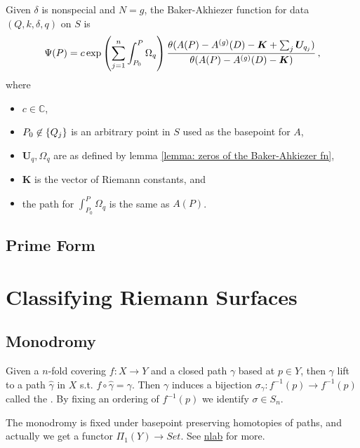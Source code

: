 \documentclass{article}
\begin{document}
\begin{theorem}
	Given $\delta$ is nonspecial and $N=g$, the Baker-Akhiezer function for data $(Q,k,\delta,q)$ on $S$ is 
	\[
	\Psi(P) = c \exp \left( \sum_{j=1}^n \int_{P_0}^P \Omega_q \right) \frac{\theta(A(P) - A^{(g)}(D)  - \bm{K} + \sum_{j} \bm{U}_{q_j})}{\theta(A(P) - A^{(g)}(D) - \bm{K})} \, ,
	\]
	where 
	\begin{itemize}
		\item $c \in \mathbb{C}$,
		\item $P_0\not\in \left\{ Q_j \right\}$ is an arbitrary point in $S$ used as the basepoint for $A$,
		\item $\bm{U}_q, \Omega_q$ are as defined by lemma \ref{lemma: zeros of the Baker-Ahkiezer fn},
		\item $\bm{K}$ is the vector of Riemann constants, and 
		\item the path for $\int_{P_0}^P \Omega_q$ is the same as $A(P)$. 
	\end{itemize}
\end{theorem}

\subsection{Prime Form}


\section{Classifying Riemann Surfaces}

\subsection{Monodromy}
\begin{definition}
	Given a $n$-fold covering $f:X \to Y$ and a closed path $\gamma$ based at $p \in Y$, then $\gamma$ lift to a path $\hat{\gamma}$ in $X$ s.t. $f \circ \hat{\gamma}=\gamma$. Then $\gamma$ induces a bijection $\sigma_\gamma : f^{-1}(p) \to f^{-1}(p)$ called the . By fixing an ordering of $f^{-1}(p)$ we identify $\sigma \in S_n$.  
\end{definition}
\begin{remark}
	The monodromy is fixed under basepoint preserving homotopies of paths, and actually we get a functor $\Pi_1(Y) \to Set$. See \href{https://ncatlab.org/nlab/show/monodromy}{nlab} for more. 
\end{remark}
\end{document}

